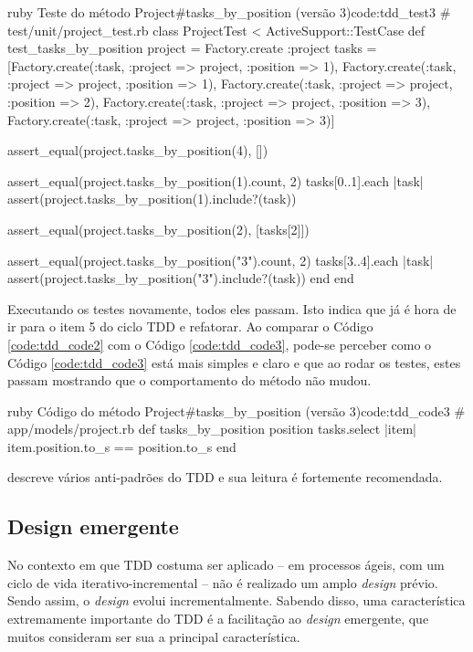 \begin{mycode}{ruby}%
{Teste do método Project\#tasks\_by\_position (versão 3)}{code:tdd_test3}
# test/unit/project_test.rb
class ProjectTest < ActiveSupport::TestCase
  def test_tasks_by_position
    project = Factory.create :project
    tasks = [Factory.create(:task, :project => project, :position => 1),
             Factory.create(:task, :project => project, :position => 1),
             Factory.create(:task, :project => project, :position => 2),
             Factory.create(:task, :project => project, :position => 3),
             Factory.create(:task, :project => project, :position => 3)]

    assert_equal(project.tasks_by_position(4), [])

    assert_equal(project.tasks_by_position(1).count, 2)
    tasks[0..1].each { |task| assert(project.tasks_by_position(1).include?(task)) }

    assert_equal(project.tasks_by_position(2), [tasks[2]])

    assert_equal(project.tasks_by_position("3").count, 2)
    tasks[3..4].each { |task| assert(project.tasks_by_position("3").include?(task)) }
  end
end
\end{mycode}

Executando os testes novamente, todos eles passam. Isto indica que já é hora de ir para o item 5 do ciclo TDD e refatorar. Ao comparar o Código \ref{code:tdd_code2} com o Código \ref{code:tdd_code3}, pode-se perceber como o Código \ref{code:tdd_code3} está mais simples e claro e que ao rodar os testes, estes passam mostrando que o comportamento do método não mudou.

\begin{mycode}{ruby}%
{Código do método Project\#tasks\_by\_position (versão 3)}{code:tdd_code3}
# app/models/project.rb
def tasks_by_position position
  tasks.select { |item| item.position.to_s == position.to_s }
end
\end{mycode}

 descreve vários anti-padrões do TDD e sua leitura é fortemente recomendada.

\subsection{Design emergente} %
\label{sub:design_emergente}

No contexto em que TDD costuma ser aplicado – em processos ágeis, com um ciclo de vida iterativo-incremental – não é realizado um amplo \textit{design} prévio. Sendo assim, o \textit{design} evolui incrementalmente. Sabendo disso, uma característica extremamente importante do TDD é a facilitação ao \textit{design} emergente, que muitos consideram ser sua a principal característica.

